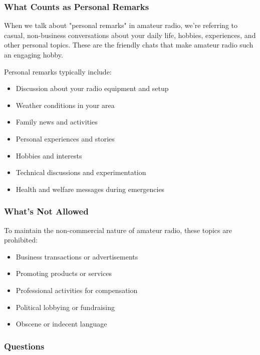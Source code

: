 \subsubsection*{What Counts as Personal Remarks}
When we talk about "personal remarks" in amateur radio, we're referring to casual, non-business conversations about your daily life, hobbies, experiences, and other personal topics. These are the friendly chats that make amateur radio such an engaging hobby.


Personal remarks typically include:
\begin{itemize}[noitemsep]
    \item Discussion about your radio equipment and setup
    \item Weather conditions in your area
    \item Family news and activities
    \item Personal experiences and stories
    \item Hobbies and interests
    \item Technical discussions and experimentation
    \item Health and welfare messages during emergencies
\end{itemize}

\subsubsection*{What's Not Allowed}
To maintain the non-commercial nature of amateur radio, these topics are prohibited:
\begin{itemize}[noitemsep]
    \item Business transactions or advertisements
    \item Promoting products or services
    \item Professional activities for compensation
    \item Political lobbying or fundraising
    \item Obscene or indecent language
\end{itemize}

\subsubsection*{Questions}

